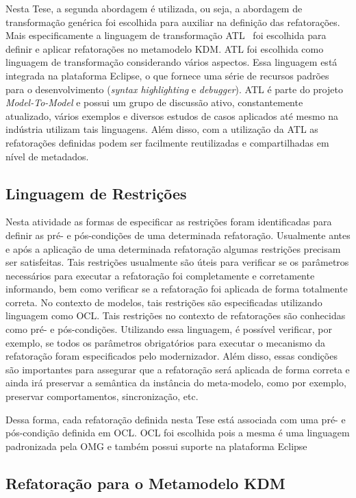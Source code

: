 Nesta Tese, a segunda abordagem é utilizada, ou seja, a abordagem de transformação genérica foi escolhida para auxiliar na definição das refatorações. Mais especificamente a linguagem de transformação ATL~\cite{ATL_eclipse,Jouault_2008} foi escolhida para definir e aplicar refatorações no metamodelo KDM. ATL foi escolhida como linguagem de transformação considerando vários aspectos. Essa linguagem está integrada na plataforma Eclipse, o que fornece uma série de recursos padrões para o desenvolvimento (\textit{syntax highlighting} e \textit{debugger}). ATL é parte do projeto \textit{Model-To-Model} e possui um grupo de discussão ativo, constantemente atualizado, vários exemplos e diversos estudos de casos aplicados até mesmo na indústria utilizam tais linguagens. Além disso, com a utilização da ATL as refatorações definidas podem ser facilmente reutilizadas e compartilhadas em nível de metadados.

\subsection{Linguagem de Restrições}

Nesta atividade as formas de especificar as restrições foram identificadas para definir as pré- e pós-condições de uma determinada refatoração. Usualmente antes e após a aplicação de uma determinada refatoração algumas restrições precisam ser satisfeitas. Tais restrições usualmente são úteis para verificar se os parâmetros necessários para executar a refatoração foi completamente e corretamente informando, bem como verificar se a refatoração foi aplicada de forma totalmente correta. No contexto de modelos, tais restrições são especificadas utilizando linguagem como OCL. Tais restrições no contexto de refatorações são conhecidas como pré- e pós-condições. Utilizando essa linguagem, é possível verificar, por exemplo, se todos os parâmetros obrigatórios para executar o mecanismo da refatoração foram especificados pelo modernizador. Além disso, essas condições são importantes para assegurar que a refatoração será aplicada de forma correta e ainda irá preservar a semântica da instância do meta-modelo, como por exemplo, preservar comportamentos, sincronização, etc. 

Dessa forma, cada refatoração definida nesta Tese está associada com uma pré- e pós-condição definida em OCL. OCL foi escolhida pois a mesma é uma linguagem padronizada pela OMG e também possui suporte na plataforma Eclipse


\subsection{Refatoração para o Metamodelo KDM}

